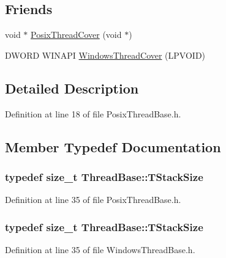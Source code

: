 \subsection*{Friends}
\begin{DoxyCompactItemize}
\item 
void $\ast$ \hyperlink{class_thread_base_a2567acd55e8bbdbf8ac90a8f77bb4943}{Posix\-Thread\-Cover} (void $\ast$)
\item 
D\-W\-O\-R\-D W\-I\-N\-A\-P\-I \hyperlink{class_thread_base_a790b21ad102d0b813d14e54f4fbf4460}{Windows\-Thread\-Cover} (L\-P\-V\-O\-I\-D)
\end{DoxyCompactItemize}


\subsection{Detailed Description}


Definition at line 18 of file Posix\-Thread\-Base.\-h.



\subsection{Member Typedef Documentation}
\hypertarget{class_thread_base_af45bd74387b409e15989f7eddbaf3718}{
\subsubsection[{T\-Stack\-Size}]{\setlength{\rightskip}{0pt plus 5cm}typedef size\-\_\-t {\bf Thread\-Base\-::\-T\-Stack\-Size}}}\label{class_thread_base_af45bd74387b409e15989f7eddbaf3718}


Definition at line 35 of file Posix\-Thread\-Base.\-h.

\hypertarget{class_thread_base_af45bd74387b409e15989f7eddbaf3718}{
\subsubsection[{T\-Stack\-Size}]{\setlength{\rightskip}{0pt plus 5cm}typedef size\-\_\-t {\bf Thread\-Base\-::\-T\-Stack\-Size}}}\label{class_thread_base_af45bd74387b409e15989f7eddbaf3718}


Definition at line 35 of file Windows\-Thread\-Base.\-h.

